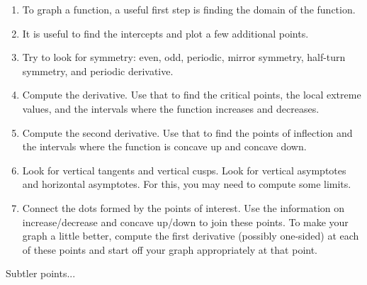 \documentclass[10pt]{amsart}
\begin{document}
\begin{enumerate}
\item To graph a function, a useful first step is finding the domain
  of the function.
\item It is useful to find the intercepts and plot a few additional points.
\item Try to look for symmetry: even, odd, periodic, mirror symmetry,
  half-turn symmetry, and periodic derivative.
\item Compute the derivative. Use that to find the critical points,
  the local extreme values, and the intervals where the function
  increases and decreases.
\item Compute the second derivative. Use that to find the points of
  inflection and the intervals where the function is concave up and
  concave down.
\item Look for vertical tangents and vertical cusps. Look for vertical
  asymptotes and horizontal asymptotes. For this, you may need to
  compute some limits.
\item Connect the dots formed by the points of interest. Use the
  information on increase/decrease and concave up/down to join these
  points. To make your graph a little better, compute the first
  derivative (possibly one-sided) at each of these points and start
  off your graph appropriately at that point.
\end{enumerate}

Subtler points...
\end{document}
